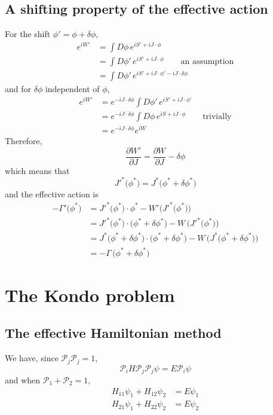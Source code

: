 \documentclass[12pt, oneside]{book}
\begin{document}
\section*{A shifting property of the effective action}
For the shift $\phi'=\phi+\delta\phi$,
\begin{align*}
e^{iW'}
&=\int D\phi\,e^{iS'+iJ\cdot\phi}\\
&=\int D\phi'\,e^{iS'+iJ\cdot\phi}\qquad
\text{an assumption}\\
&=\int D\phi'\,e^{iS'+iJ\cdot\phi'-iJ\cdot\delta\phi}
\end{align*}
and for $\delta\phi$ independent of $\phi$,
\begin{align*}
e^{iW'}
&=e^{-iJ\cdot\delta\phi}\int D\phi'\,e^{iS'+iJ\cdot\phi'}\\
&=e^{-iJ\cdot\delta\phi}\int D\phi\,e^{iS+iJ\cdot\phi}\qquad
\text{trivially}\\
&=e^{-iJ\cdot\delta\phi}e^{iW}
\end{align*}
Therefore,
\[
\frac{\partial W'}{\partial J}=\frac{\partial W}{\partial J}-\delta\phi
\]
which means that
\[
J'^*\big(\phi^*\big)=J^*\big(\phi^*+\delta\phi^*\big)
\]
and the effective action is
\begin{align*}
-\Gamma'\big(\phi^*\big)
&=J'^*\big(\phi^*\big)\cdot\phi^*-W'\big(J'^*\big(\phi^*\big)\big)\\
&=J'^*\big(\phi^*\big)\cdot\big(\phi^*+\delta\phi^*\big)-W\,\big(J'^*\big(\phi^*\big)\big)\\
&=J^*\big(\phi^*+\delta\phi^*\big)\cdot\big(\phi^*+\delta\phi^*\big)-W\,\big(J^*\big(\phi^*+\delta\phi^*\big)\big)\\
&=-\Gamma\,\big(\phi^*+\delta\phi^*\big)
\end{align*}

\chapter{The Kondo problem}
\section*{The effective Hamiltonian method}
We have, since $\mathcal{P}_j\mathcal{P}_j=1$,
\[
\mathcal{P}_iH\mathcal{P}_j\mathcal{P}_j\psi=E\mathcal{P}_i\psi
\]
and when $\mathcal{P}_1+\mathcal{P}_2=1$,
\begin{align*}
H_{11}\psi_1+H_{12}\psi_2&=E\psi_1\\
H_{21}\psi_1+H_{22}\psi_2&=E\psi_2
\end{align*}
\end{document}
